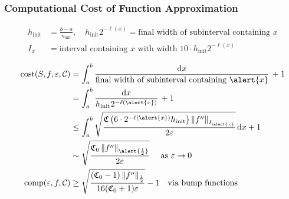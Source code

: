 \documentclass[12pt,compress,xcolor={usenames,dvipsnames}]{beamer} %
\DeclareMathOperator{\init}{init}
\newcommand{\abstol}{\varepsilon}
\begin{document}
\begin{frame}
	\frametitle{Computational Cost of Function Approximation}
	\vspace{-6.5ex}
	\begin{align*}
	h_{\init}  &= \frac{b-a}{n_{\init}},  \quad  h_{\init} 2^{-\ell(x)} = \text{final width of subinterval containing } x \\
	 I_{x}& =\text{interval containing $x$ with width } 10 \cdot h_{\init} 2^{-\ell(x)} \\
\end{align*}
\vspace{-6ex}
\begin{align*}
	\cost(S,f,\varepsilon,\cc) 
		&= \int_a^b \frac{\dif x}{\text{final width of subinterval containing } \alert{x}} \,  + 1\\
		&= \int_a^b \frac{\dif x}{h_{\init} 2^{-\ell(\alert{x})}} \,  + 1\\
	&\le \int_a^b \sqrt{\frac{\fC\left(6\cdot 2^{-\ell(\alert{x})} h_{\init}\right) \norm[I_{\alert{x}}]{f''} }{2 \abstol}}  \, \dif x + 1\\
	& \sim \sqrt{\frac{\fC_0 \norm[\alert{\frac 12}]{f''}}{2\abstol}}  \quad \text{ as } \varepsilon \to 0 \\
	\comp(\varepsilon,f,\cc) &\ge \sqrt{\frac{(\fC_0-1)  \norm[\frac12]{f''} }{16(\fC_0+1)\varepsilon}} -1 \quad \text{via bump functions}
	\end{align*}
\end{frame}
\end{document}
